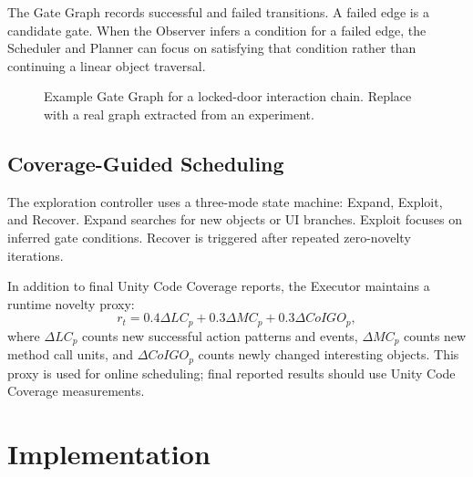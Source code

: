 \documentclass[10pt,conference]{IEEEtran}
\begin{document}
The Gate Graph records successful and failed transitions. A failed edge is a
candidate gate. When the Observer infers a condition for a failed edge, the
Scheduler and Planner can focus on satisfying that condition rather than
continuing a linear object traversal.

\begin{figure}[t]
\centering
{}
\caption{Example Gate Graph for a locked-door interaction chain. Replace with a
real graph extracted from an experiment.}
\label{fig:ggraph}
\end{figure}

\subsection{Coverage-Guided Scheduling}

The exploration controller uses a three-mode state machine: Expand, Exploit,
and Recover. Expand searches for new objects or UI branches. Exploit focuses on
inferred gate conditions. Recover is triggered after repeated zero-novelty
iterations.

In addition to final Unity Code Coverage reports, the Executor maintains a
runtime novelty proxy:
\begin{equation}
r_t = 0.4 \Delta LC_p + 0.3 \Delta MC_p + 0.3 \Delta CoIGO_p,
\end{equation}
where $\Delta LC_p$ counts new successful action patterns and events,
$\Delta MC_p$ counts new method call units, and $\Delta CoIGO_p$ counts newly
changed interesting objects. This proxy is used for online scheduling; final
reported results should use Unity Code Coverage measurements.

\section{Implementation}
\end{document}
